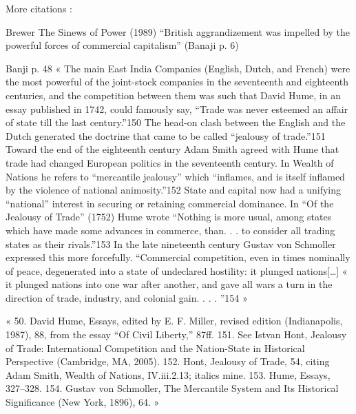 \documentclass[12pt,a4paper,notitlepage,english]{article}
\begin{document}
More citations :

Brewer The Sinews of Power (1989) “British aggrandizement was impelled by the powerful forces of commercial capitalism” (Banaji p. 6)


Banji p. 48 « The main East India Companies (English, Dutch, and French) were the most powerful of the joint-stock companies in the seventeenth and eighteenth centuries, and the competition between them was such that David Hume, in an essay published in 1742, could famously say, “Trade was never esteemed an affair of state till the last century.”150 The head-on clash between the English and the Dutch generated the doctrine that came to be called “jealousy of trade.”151 Toward the end of the eighteenth century Adam Smith agreed with Hume that trade had changed European politics in the seventeenth century. In Wealth of Nations he refers to “mercantile jealousy” which “inflames, and is itself inflamed by the violence of national animosity.”152 State and capital now had a unifying “national” interest in securing or retaining commercial dominance. In “Of the Jealousy of Trade” (1752) Hume wrote “Nothing is more usual, among states which have made some advances in commerce, than. . .  to consider all trading states as their rivals.”153 In the late nineteenth century Gustav von Schmoller expressed this more forcefully. “Commercial competition, even in times nominally of peace, degenerated into a state of undeclared hostility: it plunged nations[…] « it plunged nations into one war after another, and gave all wars a turn in the direction of trade, industry, and colonial gain. . . . ”154 »

« 50.	David Hume, Essays, edited by E. F. Miller, revised edition (Indianapolis, 1987), 88, from the essay “Of Civil Liberty,” 87ff.
151.	See Istvan Hont, Jealousy of Trade: International Competition and the Nation-State in Historical Perspective (Cambridge, MA, 2005).
152.	Hont, Jealousy of Trade, 54, citing Adam Smith, Wealth of Nations, IV.iii.2.13; italics mine.
153.	Hume, Essays, 327–328.
154.	Gustav von Schmoller, The Mercantile System and Its Historical Significance (New York, 1896), 64. »
\end{document}
